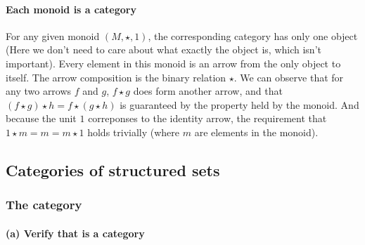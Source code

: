 \documentclass[11pt]{article}
\begin{document}
\paragraph{Each monoid is a category} For any given monoid $(M, \star , 1)$, the corresponding
category has only one object (Here we don't need to care about
what exactly the object is, which isn't important). Every element in
this monoid is an arrow from the only object to itself.
The arrow composition is
the binary relation $\star$. We can observe that for any two arrows $f$ and $g$, $f \star g$
does form another arrow, and that $(f \star g) \star h = f \star (g \star h)$
is guaranteed by the property held by the monoid.
And because the unit $1$ correponses to the identity arrow,
the requirement that $1 \star m = m = m \star 1$ holds trivially (where $m$ are
elements in the monoid).

\subsection{Categories of structured sets}

\subsubsection{The category }

\paragraph{(a) Verify that  is a category}
\end{document}
